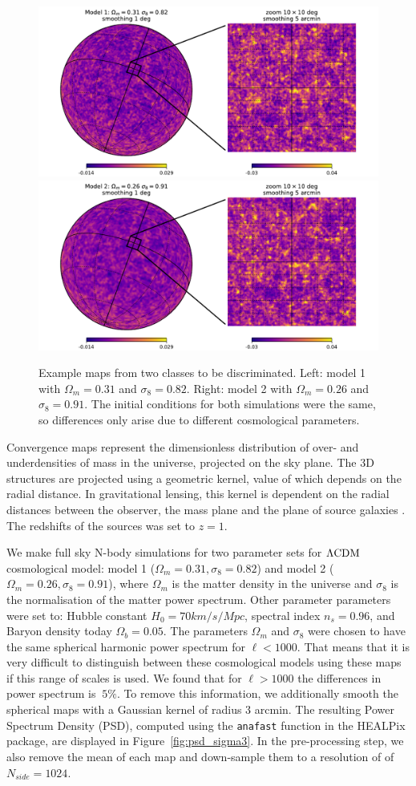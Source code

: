 \documentclass[final,twocolumn,3p,times,authoryear]{elsarticle}
\newcommand{\nati}[1]{{\color[rgb]{.1,.6,.1}{#1}}}
\newcommand{\figref}[1]{Figure~\ref{fig:#1}}
\newcommand{\1}{\b{1}}              %
\newcommand{\0}{\b{0}}              %
\begin{document}
\begin{figure}
\centering
\includegraphics[trim=1cm 0cm 0cm 0cm, width=0.49\linewidth]{figures/figure_kappa_diff_model1.pdf}
\includegraphics[trim=0cm 0cm 1cm 0cm, width=0.49\linewidth]{figures/figure_kappa_diff_model2.pdf}
\caption{Example maps from two classes to be discriminated. Left: model 1 with $\Omega_m=0.31$ and $\sigma_8=0.82$. Right: model 2 with $\Omega_m=0.26$ and $\sigma_8=0.91$.
The initial conditions for both simulations were the same, so differences only arise due to different cosmological parameters. \nati{Tomek: Is this correct?}}
\label{fig:map_sample}
\end{figure}


Convergence maps represent the dimensionless distribution of over- and underdensities of mass in the universe, projected on the sky plane.
The 3D structures are projected using a geometric kernel, value of which depends on the radial distance.
In gravitational lensing, this kernel is dependent on the radial distances between the observer, the mass plane and the plane of source galaxies \citep[see][for review of gravitational lensing]{bartelman2010gravitationallensing}.
The redshifts of the sources was set to $z=1$.

We make full sky N-body simulations for two parameter sets for $\Lambda\rm{CDM} $ cosmological model: model 1 ($\Omega_m=0.31, \sigma_8=0.82$) and model 2 ($\Omega_m=0.26, \sigma_8=0.91$), where $\Omega_m$ is the matter density in the universe and $\sigma_8$ is the normalisation of the matter power spectrum.
Other parameter parameters were set to: Hubble constant $H_0=70 km/s/Mpc$, spectral index $n_s=0.96$, and Baryon density today $\Omega_b=0.05$.
The parameters $\Omega_m$ and $\sigma_8$ were chosen to have the same spherical harmonic power spectrum for $\ell<1000$.
That means that it is very difficult to distinguish between these cosmological models using these maps if this range of scales is used.
We found that for $\ell>1000$ the differences in power spectrum is $~5\%$.
To remove this information, we additionally smooth the spherical maps with a Gaussian kernel of radius $3$ arcmin.
The resulting Power Spectrum Density (PSD), computed using the \texttt{anafast} function in the HEALPix package, are displayed in \figref{psd_sigma3}.
In the pre-processing step, we also remove the mean of each map and down-sample them to a resolution of of $N_{side}=1024$.
\end{document}
